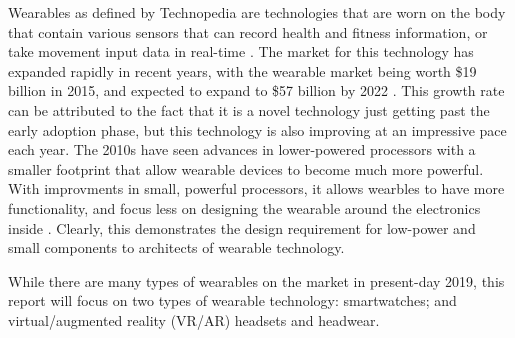 Wearables as defined by Technopedia are technologies that are worn on
the body that contain various sensors that can record health and fitness
information, or take movement input data in real-time \cite{technopedia_defn}.
The market for this technology has expanded rapidly in recent years, with the
wearable market being worth \$19 billion in 2015, and expected to expand to \$57 billion
by 2022 \cite{market_growth}. This growth rate can be attributed to the fact that it is a novel
technology just getting past the early adoption phase, but this technology is also improving
at an impressive pace each year. The 2010s have seen advances in lower-powered processors with 
a smaller footprint that allow wearable devices to become much more powerful. With improvments in
small, powerful processors, it allows wearbles to have more functionality, and focus less on
designing the wearable around the electronics inside \cite{wearable_rev}. Clearly, this demonstrates
the design requirement for low-power and small components to architects of wearable technology.

While there are many types of wearables on the market in present-day 2019, this report will
focus on two types of wearable technology: smartwatches; and virtual/augmented reality (VR/AR) headsets
and headwear.